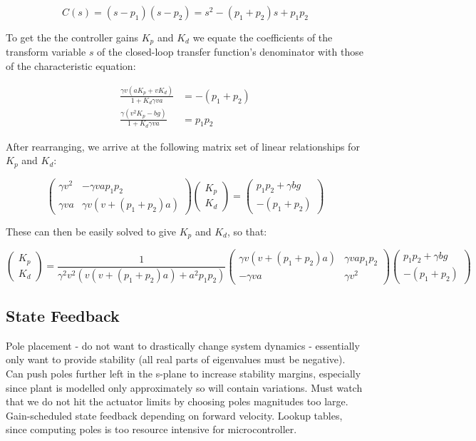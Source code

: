 \documentclass[a4paper]{article}
\begin{document}
\begin{equation*}
C(s) = (s - p_1) (s - p_2) = s^2 - (p_1 + p_2) s + p_1 p_2
\end{equation*}

To get the the controller gains $K_p$ and $K_d$ we equate the coefficients of the transform variable $s$ of the closed-loop transfer function's denominator with those of the characteristic equation:

\begin{align}
\frac{\gamma v (a K_p + v K_d)}{1 + K_d \gamma v a} &= -(p_1 + p_2) \\
\frac{\gamma (v^2 K_p - b g)}{1 + K_d \gamma v a} &= p_1 p_2
\end{align}

After rearranging, we arrive at the following matrix set of linear relationships for $K_p$ and $K_d$:

\begin{equation}
\begin{pmatrix}
\gamma v^2 & -\gamma v a p_1 p_2 \\
\gamma v a & \gamma v (v + (p_1 + p_2) a) 
\end{pmatrix}
\begin{pmatrix}
K_p \\ K_d
\end{pmatrix}
=
\begin{pmatrix}
p_1 p_2 + \gamma b g \\
-(p_1 + p_2)
\end{pmatrix}
\end{equation}

These can then be easily solved to give $K_p$ and $K_d$, so that:

\begin{equation*}
\begin{pmatrix}
K_p \\ K_d
\end{pmatrix}
=
\frac{1}{\gamma^2 v^2 (v(v + (p_1 + p_2) a) + a^2 p_1 p_2)}
\begin{pmatrix}
\gamma v (v + (p_1 + p_2) a) & \gamma v a p_1 p_2 \\
-\gamma v a & \gamma v^2
\end{pmatrix}
\begin{pmatrix}
p_1 p_2 + \gamma b g \\
-(p_1 + p_2)
\end{pmatrix}
\end{equation*}

\subsection{State Feedback}
Pole placement - do not want to drastically change system dynamics - essentially only want to provide stability (all real parts of eigenvalues must be negative). Can push poles further left in the s-plane to increase stability margins, especially since plant is modelled only approximately so will contain variations. Must watch that we do not hit the actuator limits by choosing poles magnitudes too large. \\
Gain-scheduled state feedback depending on forward velocity. Lookup tables, since computing poles is too resource intensive for microcontroller.
\end{document}
